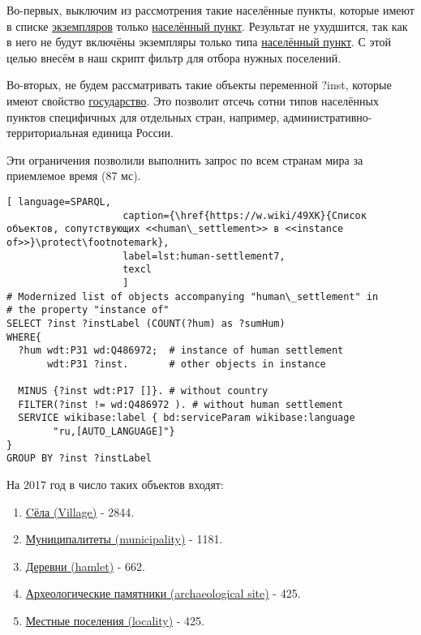Во-первых, выключим из рассмотрения такие населённые пункты, которые имеют в списке \href{http://www.wikidata.org/entity/Q21503252}{экземпляров} только \href{http://www.wikidata.org/entity/Q486972}{населённый пункт}. Результат не ухудшится, так как в него не будут включёны экземпляры только типа \href{http://www.wikidata.org/entity/Q486972}{населённый пункт}. С этой целью внесём в наш скрипт фильтр для отбора нужных поселений.

Во-вторых, не будем рассматривать такие объекты переменной ?inst, которые имеют свойство \href{http://www.wikidata.org/entity/Q17}{государство}. Это позволит отсечь сотни типов населённых пунктов специфичных для отдельных стран, например, административно-территориальная единица России.

Эти ограничения позволили выполнить запрос по всем странам мира за приемлемое время (\num{87} мс).

\begin{lstlisting}[ language=SPARQL, 
                    caption={\href{https://w.wiki/49XK}{Cписок объектов, сопутствующих <<human\_settlement>> в <<instance of>>}\protect\footnotemark},
                    label=lst:human-settlement7,
                    texcl 
                    ]
# Modernized list of objects accompanying "human\_settlement" in 
# the property "instance of"
SELECT ?inst ?instLabel (COUNT(?hum) as ?sumHum) 
WHERE{ 
  ?hum wdt:P31 wd:Q486972;  # instance of human settlement
       wdt:P31 ?inst.       # other objects in instance
  
  MINUS {?inst wdt:P17 []}. # without country
  FILTER(?inst != wd:Q486972 ). # without human settlement
  SERVICE wikibase:label { bd:serviceParam wikibase:language 
		"ru,[AUTO_LANGUAGE]"}
}  
GROUP BY ?inst ?instLabel
\end{lstlisting}%

На 2017 год в число таких объектов входят:
\begin{enumerate} 
  \item \href{http://www.wikidata.org/entity/Q532}{Cёла (Village)} - \num{2844}.
  \item \href{http://www.wikidata.org/entity/Q15284}{Муниципалитеты (municipality)} - \num{1181}.
  \item \href{http://www.wikidata.org/entity/Q5084}{Деревни (hamlet)} - \num{662}.
  \item \href{http://www.wikidata.org/entity/Q839954}{Археологические памятники (archaeological site)} - \num{425}.
  \item \href{http://www.wikidata.org/entity/Q3257686}{Местные поселения (locality)} - \num{425}.
\end{enumerate}

